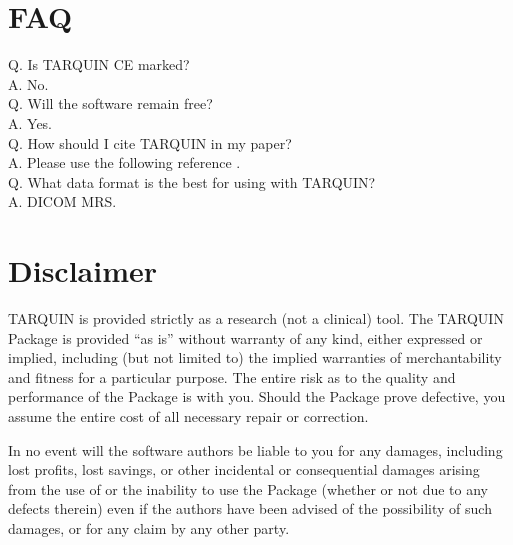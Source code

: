 \documentclass[a4paper,12pt]{article}
\begin{document}

\section{FAQ}
Q. Is TARQUIN CE marked?\\ 
A. No. \\
Q. Will the software remain free? \\
A. Yes. \\
Q. How should I cite TARQUIN in my paper? \\
A. Please use the following reference \cite{tarquin_paper}. \\
Q. What data format is the best for using with TARQUIN? \\
A. DICOM MRS.

\section{Disclaimer}
TARQUIN is provided strictly as a research (not a clinical) tool.  The TARQUIN Package is provided ``as is'' without warranty of any kind, either expressed or implied, including (but not limited to) the implied warranties of merchantability and fitness for a particular purpose. The entire risk as to the quality and performance of the Package is with you. Should the Package prove defective, you assume the entire cost of all necessary repair or correction.

In no event will the software authors be liable to you for any damages, including lost profits, lost savings, or other incidental or consequential damages arising from the use of or the inability to use the Package (whether or not due to any defects therein) even if the authors have been advised of the possibility of such damages, or for any claim by any other party. 



\end{document}
